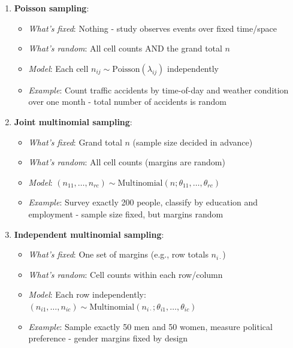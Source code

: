 \begin{enumerate}
    \item \textbf{Poisson sampling}:
        \begin{itemize}
            \item \emph{What's fixed}: Nothing - study observes events over fixed time/space
            \item \emph{What's random}: All cell counts AND the grand total $n$
            \item \emph{Model}: Each cell $n_{ij} \sim \text{Poisson}(\lambda_{ij})$ independently
            \item \emph{Example}: Count traffic accidents by time-of-day and weather condition
                over one month - total number of accidents is random
        \end{itemize}

    \item \textbf{Joint multinomial sampling}:
        \begin{itemize}
            \item \emph{What's fixed}: Grand total $n$ (sample size decided in advance)
            \item \emph{What's random}: All cell counts (margins are random)
            \item \emph{Model}: $(n_{11}, \ldots, n_{rc}) \sim \text{Multinomial}(n; \theta_{11}, \ldots, \theta_{rc})$
            \item \emph{Example}: Survey exactly 200 people, classify by education and employment
                - sample size fixed, but margins random
        \end{itemize}

    \item \textbf{Independent multinomial sampling}:
        \begin{itemize}
            \item \emph{What's fixed}: One set of margins (e.g., row totals $n_{i\cdot}$)
            \item \emph{What's random}: Cell counts within each row/column
            \item \emph{Model}: Each row independently: $(n_{i1}, \ldots, n_{ic}) \sim \text{Multinomial}(n_{i\cdot}; \theta_{i1}, \ldots, \theta_{ic})$
            \item \emph{Example}: Sample exactly 50 men and 50 women, measure political preference
                - gender margins fixed by design
        \end{itemize}


\end{enumerate}
